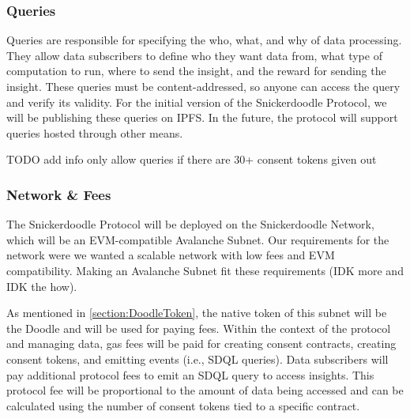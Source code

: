 \subsubsection{Queries}
Queries are responsible for specifying the who, what, and why of data processing. They allow data subscribers to define who they want data from, what type 
of computation to run, where to send the insight, and the reward for sending the insight. These queries must be content-addressed, so anyone can access the 
query and verify its validity. For the initial version of the Snickerdoodle Protocol, we will be publishing these queries on IPFS. In the future, the protocol 
will support queries hosted through other means.

TODO add info only allow queries if there are 30+ consent tokens given out

\subsubsection{Network \& Fees}

The Snickerdoodle Protocol will be deployed on the Snickerdoodle Network, which will be an EVM-compatible Avalanche Subnet. Our requirements for the 
network were we wanted a scalable network with low fees and EVM compatibility. Making an Avalanche Subnet fit these requirements (IDK more and IDK the how).

As mentioned in \ref{section:DoodleToken}, the native token of this subnet will be the Doodle and will be used for paying fees. Within the context 
of the protocol and managing data, gas fees will be paid for creating consent contracts, creating consent tokens, and emitting events (i.e., SDQL queries). 
Data subscribers will pay additional protocol fees to emit an SDQL query to access insights. This protocol fee will be proportional to the amount of data 
being accessed and can be calculated using the number of consent tokens tied to a specific contract.

